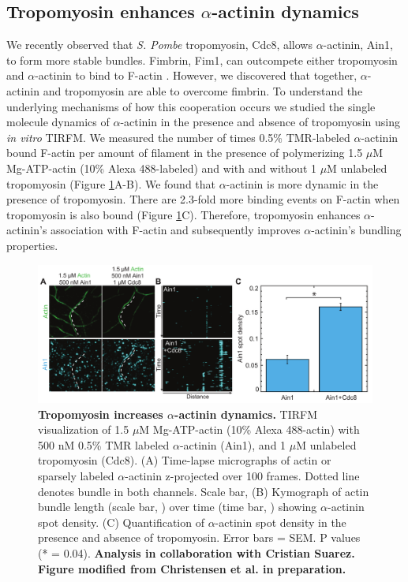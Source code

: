 \subsection{Tropomyosin enhances \texorpdfstring{$\alpha$}{a}-actinin dynamics}
We recently observed that \textit{S. Pombe} tropomyosin, Cdc8, allows $\alpha$-actinin, Ain1, to form more stable bundles. Fimbrin, Fim1, can outcompete either tropomyosin and $\alpha$-actinin to bind to F-actin \citep{christensen_competition_2017}. However, we discovered that together, $\alpha$-actinin and tropomyosin are able to overcome fimbrin. To understand the underlying mechanisms of how this cooperation occurs we studied the single molecule dynamics of $\alpha$-actinin in the presence and absence of tropomyosin using \textit{in vitro} TIRFM. We measured the number of times 0.5\% TMR-labeled $\alpha$-actinin bound F-actin per amount of filament in the presence of polymerizing 1.5 $\mu$M Mg-ATP-actin (10\% Alexa 488-labeled) and with and without 1 $\mu$M unlabeled tropomyosin (Figure \ref{fig:tropo_aact}A-B). We found that $\alpha$-actinin is more dynamic in the presence of tropomyosin. There are 2.3-fold more binding events on F-actin when tropomyosin is also bound (Figure \ref{fig:tropo_aact}C). Therefore, tropomyosin enhances $\alpha$-actinin's association with F-actin and subsequently improves $\alpha$-actinin's bundling properties. 

\begin{figure}
\centering
\includegraphics[width=\textwidth]{img/ch03/Thesis_aact_dynamics.pdf}
\caption[Tropomyosin increases \texorpdfstring{$\alpha$}{alpha}-actinin dynamics.]{\textbf{Tropomyosin increases $\alpha$-actinin dynamics.} TIRFM visualization of 1.5 $\mu$M Mg-ATP-actin (10\% Alexa 488-actin) with 500 nM 0.5\% TMR labeled $\alpha$-actinin (Ain1), and 1 $\mu$M unlabeled tropomyosin (Cdc8). (A) Time-lapse micrographs of actin or sparsely labeled $\alpha$-actinin z-projected over 100 frames. Dotted line denotes bundle in both channels. Scale bar, (B) Kymograph of actin bundle length (scale bar, ) over time (time bar, ) showing $\alpha$-actinin spot density. (C) Quantification of $\alpha$-actinin spot density in the presence and absence of tropomyosin. Error bars = SEM. P values (* = 0.04). \textbf{Analysis in collaboration with Cristian Suarez. Figure modified from Christensen et al. in preparation.}}
\label{fig:tropo_aact}
\end{figure}

